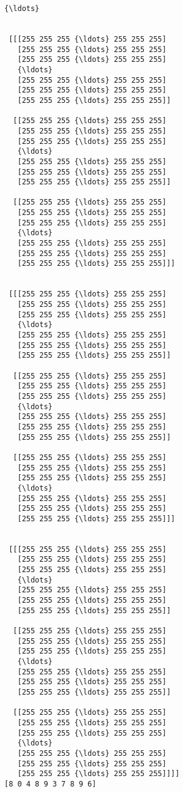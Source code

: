 \documentclass[11pt]{article}
\begin{document}
\begin{Verbatim}[commandchars=\\\{\}]
 {\ldots}


 [[[255 255 255 {\ldots} 255 255 255]
   [255 255 255 {\ldots} 255 255 255]
   [255 255 255 {\ldots} 255 255 255]
   {\ldots}
   [255 255 255 {\ldots} 255 255 255]
   [255 255 255 {\ldots} 255 255 255]
   [255 255 255 {\ldots} 255 255 255]]

  [[255 255 255 {\ldots} 255 255 255]
   [255 255 255 {\ldots} 255 255 255]
   [255 255 255 {\ldots} 255 255 255]
   {\ldots}
   [255 255 255 {\ldots} 255 255 255]
   [255 255 255 {\ldots} 255 255 255]
   [255 255 255 {\ldots} 255 255 255]]

  [[255 255 255 {\ldots} 255 255 255]
   [255 255 255 {\ldots} 255 255 255]
   [255 255 255 {\ldots} 255 255 255]
   {\ldots}
   [255 255 255 {\ldots} 255 255 255]
   [255 255 255 {\ldots} 255 255 255]
   [255 255 255 {\ldots} 255 255 255]]]


 [[[255 255 255 {\ldots} 255 255 255]
   [255 255 255 {\ldots} 255 255 255]
   [255 255 255 {\ldots} 255 255 255]
   {\ldots}
   [255 255 255 {\ldots} 255 255 255]
   [255 255 255 {\ldots} 255 255 255]
   [255 255 255 {\ldots} 255 255 255]]

  [[255 255 255 {\ldots} 255 255 255]
   [255 255 255 {\ldots} 255 255 255]
   [255 255 255 {\ldots} 255 255 255]
   {\ldots}
   [255 255 255 {\ldots} 255 255 255]
   [255 255 255 {\ldots} 255 255 255]
   [255 255 255 {\ldots} 255 255 255]]

  [[255 255 255 {\ldots} 255 255 255]
   [255 255 255 {\ldots} 255 255 255]
   [255 255 255 {\ldots} 255 255 255]
   {\ldots}
   [255 255 255 {\ldots} 255 255 255]
   [255 255 255 {\ldots} 255 255 255]
   [255 255 255 {\ldots} 255 255 255]]]


 [[[255 255 255 {\ldots} 255 255 255]
   [255 255 255 {\ldots} 255 255 255]
   [255 255 255 {\ldots} 255 255 255]
   {\ldots}
   [255 255 255 {\ldots} 255 255 255]
   [255 255 255 {\ldots} 255 255 255]
   [255 255 255 {\ldots} 255 255 255]]

  [[255 255 255 {\ldots} 255 255 255]
   [255 255 255 {\ldots} 255 255 255]
   [255 255 255 {\ldots} 255 255 255]
   {\ldots}
   [255 255 255 {\ldots} 255 255 255]
   [255 255 255 {\ldots} 255 255 255]
   [255 255 255 {\ldots} 255 255 255]]

  [[255 255 255 {\ldots} 255 255 255]
   [255 255 255 {\ldots} 255 255 255]
   [255 255 255 {\ldots} 255 255 255]
   {\ldots}
   [255 255 255 {\ldots} 255 255 255]
   [255 255 255 {\ldots} 255 255 255]
   [255 255 255 {\ldots} 255 255 255]]]]
[8 0 4 8 9 3 7 8 9 6]

    \end{Verbatim}
\end{document}

